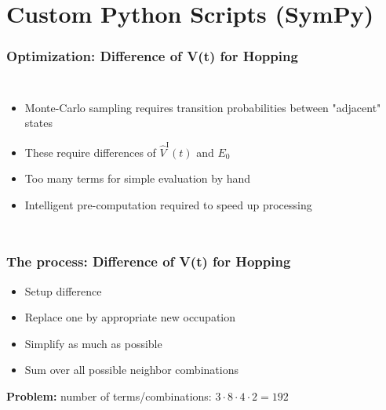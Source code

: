 \section{Custom Python Scripts (SymPy)}
    \begin{frame}
        \frametitle{Optimization: Difference of V(t) for Hopping}

        \begin{columns}
                \begin{itemize}
                    \item Monte-Carlo sampling requires transition probabilities between "adjacent" states
                    \item These require differences of $\hat{V}^\mathrm{I}(t)$ and $E_0$
                    \item Too many terms for simple evaluation by hand
                    \item Intelligent pre-computation required to speed up processing
                \end{itemize}
                
        \end{columns}
    \end{frame}


    \begin{frame}
        \frametitle{The process: Difference of V(t) for Hopping}
        
        \hspace{-1cm}

        \vspace{0.3cm}

        \begin{itemize}
            \item Setup difference
            \item Replace one by appropriate new occupation
            \item Simplify as much as possible
            \item Sum over all possible neighbor combinations
        \end{itemize}

        \vspace{0.1cm}
        
        \textbf{Problem:} number of terms/combinations: $3 \cdot 8 \cdot 4 \cdot 2 = 192$
    \end{frame}

